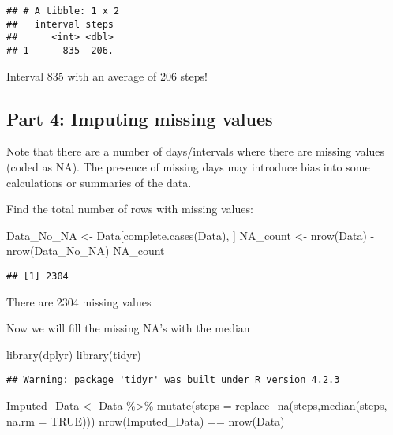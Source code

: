 \documentclass[
]{article}
\newenvironment{Shaded}{\begin{snugshade}}{\end{snugshade}}
\newcommand{\AttributeTok}[1]{\textcolor[rgb]{0.77,0.63,0.00}{#1}}
\newcommand{\ConstantTok}[1]{\textcolor[rgb]{0.00,0.00,0.00}{#1}}
\newcommand{\FunctionTok}[1]{\textcolor[rgb]{0.00,0.00,0.00}{#1}}
\newcommand{\NormalTok}[1]{#1}
\newcommand{\OtherTok}[1]{\textcolor[rgb]{0.56,0.35,0.01}{#1}}
\newcommand{\SpecialCharTok}[1]{\textcolor[rgb]{0.00,0.00,0.00}{#1}}
\begin{document}
\begin{verbatim}
## # A tibble: 1 x 2
##   interval steps
##      <int> <dbl>
## 1      835  206.
\end{verbatim}

Interval 835 with an average of 206 steps!

\hypertarget{part-4-imputing-missing-values}{%
\subsection{Part 4: Imputing missing
values}\label{part-4-imputing-missing-values}}

Note that there are a number of days/intervals where there are missing
values (coded as NA). The presence of missing days may introduce bias
into some calculations or summaries of the data.

Find the total number of rows with missing values:

\begin{Shaded}
\begin{Highlighting}[]
\NormalTok{Data\_No\_NA }\OtherTok{\textless{}{-}}\NormalTok{ Data[}\FunctionTok{complete.cases}\NormalTok{(Data), ]}
\NormalTok{NA\_count }\OtherTok{\textless{}{-}} \FunctionTok{nrow}\NormalTok{(Data) }\SpecialCharTok{{-}} \FunctionTok{nrow}\NormalTok{(Data\_No\_NA)}
\NormalTok{NA\_count}
\end{Highlighting}
\end{Shaded}

\begin{verbatim}
## [1] 2304
\end{verbatim}

There are 2304 missing values

Now we will fill the missing NA's with the median

\begin{Shaded}
\begin{Highlighting}[]
\FunctionTok{library}\NormalTok{(dplyr)}
\FunctionTok{library}\NormalTok{(tidyr)}
\end{Highlighting}
\end{Shaded}

\begin{verbatim}
## Warning: package 'tidyr' was built under R version 4.2.3
\end{verbatim}

\begin{Shaded}
\begin{Highlighting}[]
\NormalTok{Imputed\_Data }\OtherTok{\textless{}{-}}\NormalTok{ Data }\SpecialCharTok{\%\textgreater{}\%} 
  \FunctionTok{mutate}\NormalTok{(}\AttributeTok{steps =} \FunctionTok{replace\_na}\NormalTok{(steps,}\FunctionTok{median}\NormalTok{(steps, }\AttributeTok{na.rm =} \ConstantTok{TRUE}\NormalTok{)))}
\FunctionTok{nrow}\NormalTok{(Imputed\_Data) }\SpecialCharTok{==}  \FunctionTok{nrow}\NormalTok{(Data)}
\end{Highlighting}
\end{Shaded}
\end{document}
